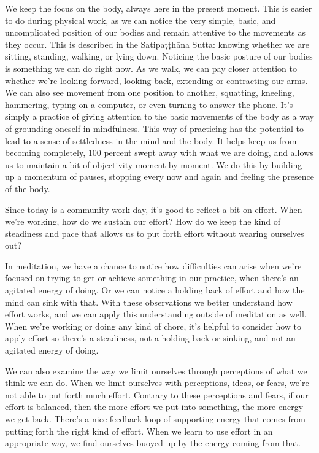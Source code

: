 We keep the focus on the body, always here in the present moment. This 
is easier to do during physical work, as we can notice the very simple, 
basic, and uncomplicated position of our bodies and remain attentive to 
the movements as they occur. This is described in the Satipaṭṭhāna 
Sutta: knowing whether we are sitting, standing, walking, or lying 
down. Noticing the basic posture of our bodies is something we can do 
right now. As we walk, we can pay closer attention to whether we're 
looking forward, looking back, extending or contracting our arms. We 
can also see movement from one position to another, squatting, 
kneeling, hammering, typing on a computer, or even turning to answer 
the phone. It's simply a practice of giving attention to the basic 
movements of the body as a way of grounding oneself in mindfulness. 
This way of practicing has the potential to lead to a sense of 
settledness in the mind and the body. It helps keep us from becoming 
completely, 100 percent swept away with what we are doing, and allows 
us to maintain a bit of objectivity moment by moment. We do this by 
building up a momentum of pauses, stopping every now and again and 
feeling the presence of the body.


Since today is a community work day, it's good to reflect a bit on 
effort. When we're working, how do we sustain our effort? How do we 
keep the kind of steadiness and pace that allows us to put forth effort 
without wearing ourselves out?

In meditation, we have a chance to notice how difficulties can arise 
when we're focused on trying to get or achieve something in our 
practice, when there's an agitated energy of doing. Or we can notice a 
holding back of effort and how the mind can sink with that. With these 
observations we better understand how effort works, and we can apply 
this understanding outside of meditation as well. When we're working or 
doing any kind of chore, it's helpful to consider how to apply effort 
so there's a steadiness, not a holding back or sinking, and not an 
agitated energy of doing.

We can also examine the way we limit ourselves through perceptions of 
what we think we can do. When we limit ourselves with perceptions, 
ideas, or fears, we're not able to put forth much effort. Contrary to 
these perceptions and fears, if our effort is balanced, then the more 
effort we put into something, the more energy we get back. There's a 
nice feedback loop of supporting energy that comes from putting forth 
the right kind of effort. When we learn to use effort in an appropriate 
way, we find ourselves buoyed up by the energy coming from that.

